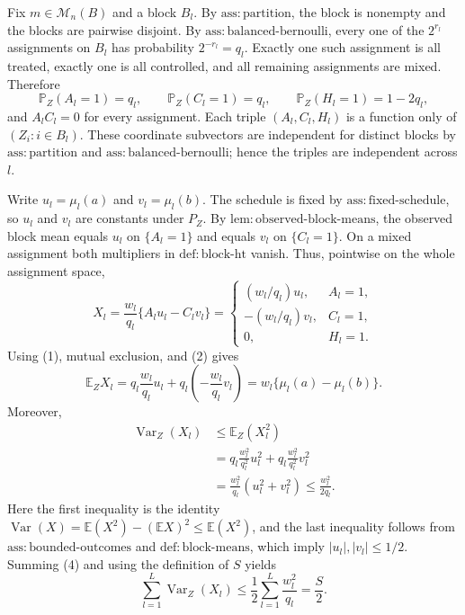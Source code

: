 Fix \(m\in\mathcal M_n(B)\) and a block \(B_l\).  By
\(\mathrm{ass{:}partition}\), the block is nonempty and the blocks are
pairwise disjoint.  By \(\mathrm{ass{:}balanced\text{-}bernoulli}\), every
one of the \(2^{r_l}\) assignments on \(B_l\) has probability
\(2^{-r_l}=q_l\).  Exactly one such assignment is all treated, exactly one
is all controlled, and all remaining assignments are mixed.  Therefore
\[
 \mathbb P_Z(A_l=1)=q_l,\qquad
 \mathbb P_Z(C_l=1)=q_l,\qquad
 \mathbb P_Z(H_l=1)=1-2q_l,
 \tag{1}
\]
and \(A_lC_l=0\) for every assignment.  Each triple
\((A_l,C_l,H_l)\) is a function only of \((Z_i:i\in B_l)\).  These
coordinate subvectors are independent for distinct blocks by
\(\mathrm{ass{:}partition}\) and
\(\mathrm{ass{:}balanced\text{-}bernoulli}\); hence the triples are
independent across \(l\).

Write \(u_l=\mu_l(a)\) and \(v_l=\mu_l(b)\).  The schedule is fixed by
\(\mathrm{ass{:}fixed\text{-}schedule}\), so \(u_l\) and \(v_l\) are
constants under \(P_Z\).  By
\(\mathrm{lem{:}observed\text{-}block\text{-}means}\), the observed block
mean equals \(u_l\) on \(\{A_l=1\}\) and equals \(v_l\) on
\(\{C_l=1\}\).  On a mixed assignment both multipliers in
\(\mathrm{def{:}block\text{-}ht}\) vanish.  Thus, pointwise on the whole
assignment space,
\[
 X_l=\frac{w_l}{q_l}\{A_lu_l-C_lv_l\}
 =
 \begin{cases}
   (w_l/q_l)u_l,&A_l=1,\\
   -(w_l/q_l)v_l,&C_l=1,\\
   0,&H_l=1.
 \end{cases}
 \tag{2}
\]
Using (1), mutual exclusion, and (2) gives
\[
 \mathbb E_ZX_l
 =q_l\frac{w_l}{q_l}u_l
  +q_l\left(-\frac{w_l}{q_l}v_l\right)
 =w_l\{\mu_l(a)-\mu_l(b)\}.
 \tag{3}
\]
Moreover,
\[
 \begin{aligned}
 \operatorname{Var}_Z(X_l)
 &\le \mathbb E_Z(X_l^2)\\
 &=q_l\frac{w_l^2}{q_l^2}u_l^2
   +q_l\frac{w_l^2}{q_l^2}v_l^2\\
 &=\frac{w_l^2}{q_l}(u_l^2+v_l^2)
 \le \frac{w_l^2}{2q_l}.
 \end{aligned}
 \tag{4}
\]
Here the first inequality is the identity
\(\operatorname{Var}(X)=\mathbb E(X^2)-(\mathbb EX)^2\le\mathbb E(X^2)\),
and the last inequality follows from
\(\mathrm{ass{:}bounded\text{-}outcomes}\) and
\(\mathrm{def{:}block\text{-}means}\), which imply
\(|u_l|,|v_l|\le 1/2\).  Summing (4) and using the definition of \(S\)
yields
\[
 \sum_{l=1}^L\operatorname{Var}_Z(X_l)
 \le \frac12\sum_{l=1}^L\frac{w_l^2}{q_l}
 =\frac S2.
 \tag{5}
\]

